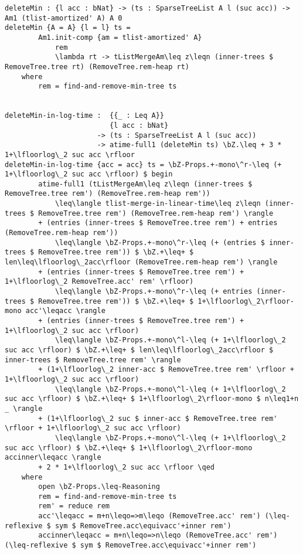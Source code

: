 \begin{lstlisting}[caption={Removing the minimum element},label={lst:appendix:heap:remove}]
deleteMin : {l acc : bNat} -> (ts : SparseTreeList A l (suc acc)) -> Am1 (tlist-amortized' A) A 0
deleteMin {A = A} {l = l} ts =
        Am1.init-comp {am = tlist-amortized' A}
            rem
            \lambda rt -> tListMergeAm\leq z\leqn (inner-trees $ RemoveTree.tree rt) (RemoveTree.rem-heap rt)
    where
        rem = find-and-remove-min-tree ts


deleteMin-in-log-time :  {{_ : Leq A}}
                         {l acc : bNat}
                      -> (ts : SparseTreeList A l (suc acc))
                      -> atime-full1 (deleteMin ts) \bZ.\leq + 3 * 1+\lfloorlog\_2 suc acc \rfloor
deleteMin-in-log-time {acc = acc} ts = \bZ-Props.+-mono\^r-\leq (+ 1+\lfloorlog\_2 suc acc \rfloor) $ begin
        atime-full1 (tListMergeAm\leq z\leqn (inner-trees $ RemoveTree.tree rem') (RemoveTree.rem-heap rem'))
            \leq\langle tlist-merge-in-linear-time\leq z\leqn (inner-trees $ RemoveTree.tree rem') (RemoveTree.rem-heap rem') \rangle
        + (entries (inner-trees $ RemoveTree.tree rem') + entries (RemoveTree.rem-heap rem'))
            \leq\langle \bZ-Props.+-mono\^r-\leq (+ (entries $ inner-trees $ RemoveTree.tree rem')) $ \bZ.+\leq+ $ len\leq\lfloorlog\_2acc\rfloor (RemoveTree.rem-heap rem') \rangle
        + (entries (inner-trees $ RemoveTree.tree rem') + 1+\lfloorlog\_2 RemoveTree.acc' rem' \rfloor)
            \leq\langle \bZ-Props.+-mono\^r-\leq (+ entries (inner-trees $ RemoveTree.tree rem')) $ \bZ.+\leq+ $ 1+\lfloorlog\_2\rfloor-mono acc'\leqacc \rangle
        + (entries (inner-trees $ RemoveTree.tree rem') + 1+\lfloorlog\_2 suc acc \rfloor)
            \leq\langle \bZ-Props.+-mono\^l-\leq (+ 1+\lfloorlog\_2 suc acc \rfloor) $ \bZ.+\leq+ $ len\leq\lfloorlog\_2acc\rfloor $ inner-trees $ RemoveTree.tree rem' \rangle
        + (1+\lfloorlog\_2 inner-acc $ RemoveTree.tree rem' \rfloor + 1+\lfloorlog\_2 suc acc \rfloor)
            \leq\langle \bZ-Props.+-mono\^l-\leq (+ 1+\lfloorlog\_2 suc acc \rfloor) $ \bZ.+\leq+ $ 1+\lfloorlog\_2\rfloor-mono $ n\leq1+n _ \rangle
        + (1+\lfloorlog\_2 suc $ inner-acc $ RemoveTree.tree rem' \rfloor + 1+\lfloorlog\_2 suc acc \rfloor)
            \leq\langle \bZ-Props.+-mono\^l-\leq (+ 1+\lfloorlog\_2 suc acc \rfloor) $ \bZ.+\leq+ $ 1+\lfloorlog\_2\rfloor-mono accinner\leqacc \rangle
        + 2 * 1+\lfloorlog\_2 suc acc \rfloor \qed
    where
        open \bZ-Props.\leq-Reasoning
        rem = find-and-remove-min-tree ts
        rem' = reduce rem
        acc'\leqacc = m+n\leqo=>m\leqo (RemoveTree.acc' rem') (\leq-reflexive $ sym $ RemoveTree.acc\equivacc'+inner rem')
        accinner\leqacc = m+n\leqo=>n\leqo (RemoveTree.acc' rem') (\leq-reflexive $ sym $ RemoveTree.acc\equivacc'+inner rem')
\end{lstlisting}